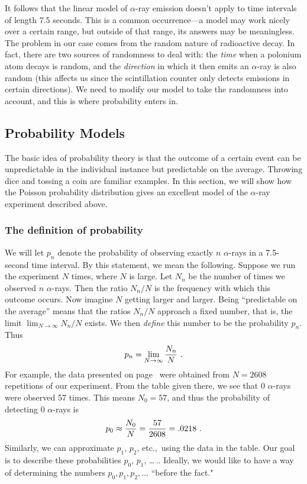 {{{{        It follows that the linear model of $\alpha$-ray emission doesn't apply to time intervals of length 7.5 seconds.  This is a common occurrence---a model may work nicely over a certain range, but outside of that range, its answers may be meaningless.  The problem in our case comes from the random nature of radioactive decay.  In fact, there are two sources of randomness to deal with: the {\em time\/} when a polonium atom decays is random, and the {\em direction\/} in which it then emits an $\alpha$-ray is also random (this affects us since the scintillation counter only detects emissions in certain directions).  We need to modify our model to take the randomness into account, and this is where probability enters in.

\subsection{Probability Models}


        The basic idea of probability theory is that the outcome
of a	certain event can be unpredictable in the individual instance but predictable on the average.  Throwing dice and tossing a coin are familiar examples.  In this section, we will show how the Poisson probability distribution gives an excellent model of the $\alpha$-ray experiment described above.

\subsubsection{The definition of probability}

        We will let $p_n$ denote the probability of observing exactly $n$ $\alpha$-rays in a 7.5-second time interval.  By this statement, we mean the following.  Suppose we run the experiment $N$ times, where $N$ is large.  Let $N_n$ be the number of times we observed $n$ $\alpha$-rays.  Then the ratio $N_n/N$ is the frequency with which this outcome occurs.  Now imagine $N$ getting larger and larger. Being ``predictable on the average'' means that the ratios $N_n/N$ approach a fixed number, that is,  the limit $\lim_{N\to\infty}N_n/N$ exists.  We then {\em define\/} this number to be the probability $p_n$.  Thus
\[ 
p_n = \lim_{N\to\infty}{N_n\over N}\ .
\]
For example, the data presented on page~\pageref{data} were obtained from $N = 2608$ repetitions of our experiment.  From the table given there, we see that 0 $\alpha$-rays were observed 57 times.  This means $N_0 = 57$, and thus the probability of detecting 0 $\alpha$-rays is
\[ 
p_0 \approx {N_0\over N} = {57\over2608} = .0218\ .
\]
Similarly, we can approximate $p_1$, $p_2$, etc.,~using the data in the table.  Our goal is to describe these probabilities $p_0$, $p_1$, \ldots \,..  Ideally, we would like to have  a way of determining the numbers $p_0, p_1, p_2, \ldots$ ``before the fact."

}}}}
